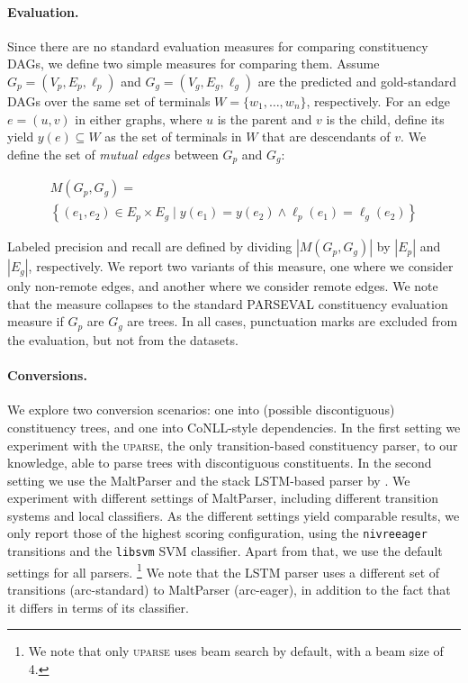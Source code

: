 \documentclass[11pt]{article}
\begin{document}
\paragraph{Evaluation.}
Since there are no standard evaluation measures for comparing constituency DAGs, we define
two simple measures for comparing them.
Assume $G_p=(V_p,E_p,\ell_p)$ and $G_g=(V_g,E_g,\ell_g)$
are the predicted and gold-standard DAGs over the same
set of terminals $W = \{w_1,\ldots,w_n\}$, respectively.
For an edge $e=(u,v)$ in either graphs,
where $u$ is the parent and $v$ is the child, define its yield $y(e) \subseteq W$ as the
set of terminals in $W$ that are descendants of $v$.
We define the set of \textit{mutual edges} between $G_p$ and $G_g$:

\vspace{-.5cm}

{\small
\begin{multline*}
    M(G_p,G_g) = \\
    \left\{(e_1,e_2) \in E_p \times E_g \;|\;
    y(e_1) = y(e_2) \wedge \ell_p(e_1)=\ell_g(e_2)\right\}
\end{multline*}
}

\vspace{-.5cm}

Labeled precision and recall are defined by dividing $|M(G_p,G_g)|$ by $|E_p|$ and $|E_g|$, respectively.
We report two variants of this measure, one where we consider only non-remote edges,
and another where we consider remote edges. We note that the measure collapses to the standard
PARSEVAL constituency evaluation measure if $G_p$ are $G_g$ are trees.
In all cases, punctuation marks are excluded from the evaluation, but not from the datasets.


\paragraph{Conversions.}
We explore two conversion scenarios: one into (possible discontiguous) constituency trees,
and one into CoNLL-style dependencies. In the first setting we experiment with the \textsc{uparse},
the only transition-based constituency parser, to our knowledge, able to parse trees with
discontiguous constituents.
In the second setting we use the MaltParser \cite{nivre2007maltparser} and the stack LSTM-based parser by
.
We experiment with different settings of MaltParser, including
different transition systems and local classifiers. As the different
settings yield comparable results, we only report those of the highest
scoring configuration, using the \texttt{nivreeager} transitions
and the \texttt{libsvm} SVM classifier.
Apart from that, we use the default settings for all parsers.
\footnote{We note that only \textsc{uparse} uses beam search by default, with a beam size of 4.}
We note that the LSTM parser uses a different set of transitions (arc-standard) to
MaltParser (arc-eager),
in addition to the fact that it differs in terms of its classifier.
\end{document}
